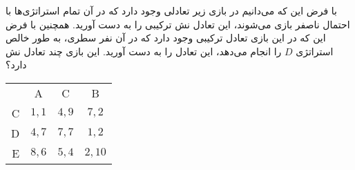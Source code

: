 با فرض این که می‌دانیم در بازی زیر تعادلی وجود دارد که در آن تمام استراتژی‌ها با احتمال ناصفر بازی می‌شوند، این تعادل نش ترکیبی را به دست آورید. همچنین با فرض این که در این بازی تعادل ترکیبی وجود دارد که در آن نفر سطری، به طور خالص استراتژی‌
$D$
را انجام می‌دهد، این تعادل را به دست آورید. این بازی چند تعادل نش دارد؟

\LTR 
\begin{latin}
    \begin{center}
        \begin{tabular}{r | c | c | c |}
            \multicolumn{1}{r}{} &
            \multicolumn{1}{c}{A} &
            \multicolumn{1}{c}{C} &
            \multicolumn{1}{c}{B} \\ \cline{2-4}
            C       & $1,1$   & $4,9$     & $7,2$  \\ \cline{2-4}
            D       & $4,7$   & $7,7$     & $1,2$  \\ \cline{2-4}
            E       & $8,6$   & $5,4$     & $2,10$ \\ \cline{2-4}
        \end{tabular}
    \end{center}
\end{latin}
\RTL